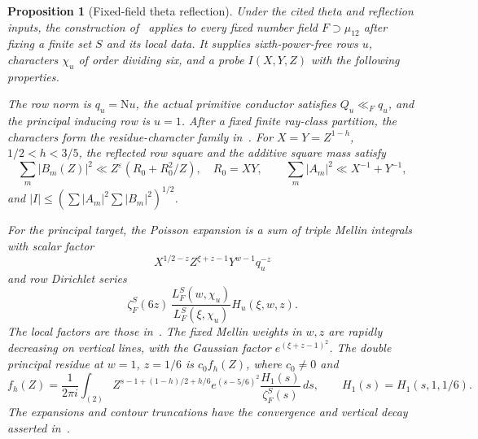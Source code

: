 \documentclass[11pt,a4paper]{article}
\numberwithin{equation}{section}
\newtheorem{proposition}[theorem]{Proposition}
\theoremstyle{remark}
\newcommand{\eps}{\varepsilon}
\newcommand{\N}{\mathrm N}
\begin{document}
\begin{proposition}[Fixed-field theta reflection]\label{prop-theta}
Under the cited theta and reflection inputs, the construction
of~\cite{OAI} applies to every fixed number field $F\supset\mu_{12}$
after fixing a finite set $S$ and its local data.  It supplies
sixth-power-free rows $u$, characters
$\chi_u$ of order dividing six, and a probe $I(X,Y,Z)$ with the
following properties.

The row norm is $q_u=\N u$, the actual primitive conductor satisfies
$Q_u\ll_F q_u$, and the principal inducing row is $u=1$.
After a fixed finite ray-class partition, the characters form the
residue-character family in~\cite{DF}.  For $X=Y=Z^{1-h}$,
$1/2<h<3/5$, the reflected row square and the additive square
mass satisfy
\begin{equation}\label{eq-reflection-input}
 \sum_m|B_m(Z)|^2\ll Z^\eps(R_0+R_0^2/Z),\quad R_0=XY,
 \qquad \sum_m|A_m|^2\ll X^{-1}+Y^{-1},
\end{equation}
and $|I|\le(\sum|A_m|^2\sum|B_m|^2)^{1/2}$.

For the principal target, the Poisson expansion is a sum of triple
Mellin integrals with scalar factor
\begin{equation}\label{eq-scalar}
 X^{1/2-z}Z^{\xi+z-1}Y^{w-1}q_u^{-z}
\end{equation}
and row Dirichlet series
\begin{equation}\label{eq-euler}
 \zeta_F^S(6z)\,
 \frac{L_F^S(w,\chi_u)}{L_F^S(\xi,\chi_u)}
 H_u(\xi,w,z).
\end{equation}
The local factors are those in~\cite[(7.16)--(7.20)]{OAI}.
The fixed Mellin weights in $w,z$ are rapidly decreasing on
vertical lines, with the Gaussian factor $e^{(\xi+z-1)^2}$.
The double principal
residue at $w=1$, $z=1/6$
is $c_0f_h(Z)$, where $c_0\ne0$ and
\begin{equation}\label{eq-main-residue}
 f_h(Z)=\frac1{2\pi i}\int_{(2)}
 Z^{s-1+(1-h)/2+h/6}e^{(s-5/6)^2}
 \frac{H_1(s)}{\zeta_F^S(s)}\,ds,
 \qquad H_1(s)=H_1(s,1,1/6).
\end{equation}
The expansions and contour truncations have the convergence and
vertical decay asserted in~\cite[Sections~7--8]{OAI}.
\end{proposition}
\end{document}
